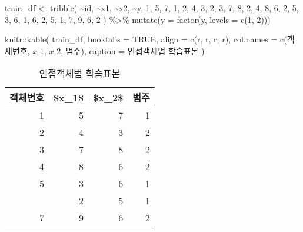 \documentclass[
]{book}
\newenvironment{Shaded}{\begin{snugshade}}{\end{snugshade}}
\newcommand{\AttributeTok}[1]{\textcolor[rgb]{0.77,0.63,0.00}{#1}}
\newcommand{\ConstantTok}[1]{\textcolor[rgb]{0.00,0.00,0.00}{#1}}
\newcommand{\DecValTok}[1]{\textcolor[rgb]{0.00,0.00,0.81}{#1}}
\newcommand{\FunctionTok}[1]{\textcolor[rgb]{0.00,0.00,0.00}{#1}}
\newcommand{\NormalTok}[1]{#1}
\newcommand{\OtherTok}[1]{\textcolor[rgb]{0.56,0.35,0.01}{#1}}
\newcommand{\SpecialCharTok}[1]{\textcolor[rgb]{0.00,0.00,0.00}{#1}}
\newcommand{\StringTok}[1]{\textcolor[rgb]{0.31,0.60,0.02}{#1}}
\begin{document}
\begin{Shaded}
\begin{Highlighting}[]
\NormalTok{train\_df }\OtherTok{\textless{}{-}} \FunctionTok{tribble}\NormalTok{(}
  \SpecialCharTok{\textasciitilde{}}\NormalTok{id, }\SpecialCharTok{\textasciitilde{}}\NormalTok{x1, }\SpecialCharTok{\textasciitilde{}}\NormalTok{x2, }\SpecialCharTok{\textasciitilde{}}\NormalTok{y,}
  \DecValTok{1}\NormalTok{, }\DecValTok{5}\NormalTok{, }\DecValTok{7}\NormalTok{, }\DecValTok{1}\NormalTok{,}
  \DecValTok{2}\NormalTok{, }\DecValTok{4}\NormalTok{, }\DecValTok{3}\NormalTok{, }\DecValTok{2}\NormalTok{,}
  \DecValTok{3}\NormalTok{, }\DecValTok{7}\NormalTok{, }\DecValTok{8}\NormalTok{, }\DecValTok{2}\NormalTok{,}
  \DecValTok{4}\NormalTok{, }\DecValTok{8}\NormalTok{, }\DecValTok{6}\NormalTok{, }\DecValTok{2}\NormalTok{,}
  \DecValTok{5}\NormalTok{, }\DecValTok{3}\NormalTok{, }\DecValTok{6}\NormalTok{, }\DecValTok{1}\NormalTok{,}
  \DecValTok{6}\NormalTok{, }\DecValTok{2}\NormalTok{, }\DecValTok{5}\NormalTok{, }\DecValTok{1}\NormalTok{,}
  \DecValTok{7}\NormalTok{, }\DecValTok{9}\NormalTok{, }\DecValTok{6}\NormalTok{, }\DecValTok{2}
\NormalTok{) }\SpecialCharTok{\%\textgreater{}\%}
  \FunctionTok{mutate}\NormalTok{(}\AttributeTok{y =} \FunctionTok{factor}\NormalTok{(y, }\AttributeTok{levels =} \FunctionTok{c}\NormalTok{(}\DecValTok{1}\NormalTok{, }\DecValTok{2}\NormalTok{)))}

\NormalTok{knitr}\SpecialCharTok{::}\FunctionTok{kable}\NormalTok{(}
\NormalTok{  train\_df, }\AttributeTok{booktabs =} \ConstantTok{TRUE}\NormalTok{,}
  \AttributeTok{align =} \FunctionTok{c}\NormalTok{(}\StringTok{\textquotesingle{}r\textquotesingle{}}\NormalTok{, }\StringTok{\textquotesingle{}r\textquotesingle{}}\NormalTok{, }\StringTok{\textquotesingle{}r\textquotesingle{}}\NormalTok{, }\StringTok{\textquotesingle{}r\textquotesingle{}}\NormalTok{),}
  \AttributeTok{col.names =} \FunctionTok{c}\NormalTok{(}\StringTok{\textquotesingle{}객체번호\textquotesingle{}}\NormalTok{, }\StringTok{\textquotesingle{}$x\_1$\textquotesingle{}}\NormalTok{, }\StringTok{\textquotesingle{}$x\_2$\textquotesingle{}}\NormalTok{, }\StringTok{\textquotesingle{}범주\textquotesingle{}}\NormalTok{),}
  \AttributeTok{caption =} \StringTok{\textquotesingle{}인접객체법 학습표본\textquotesingle{}}
\NormalTok{)}
\end{Highlighting}
\end{Shaded}

\begin{table}

\caption{\label{tab:knn-classification-data}인접객체법 학습표본}
\centering
\begin{tabular}[t]{rrrr}
\toprule
객체번호 & \$x\_1\$ & \$x\_2\$ & 범주\\
\midrule
1 & 5 & 7 & 1\\
2 & 4 & 3 & 2\\
3 & 7 & 8 & 2\\
4 & 8 & 6 & 2\\
5 & 3 & 6 & 1\\
\addlinespace
6 & 2 & 5 & 1\\
7 & 9 & 6 & 2\\
\bottomrule
\end{tabular}
\end{table}
\end{document}
